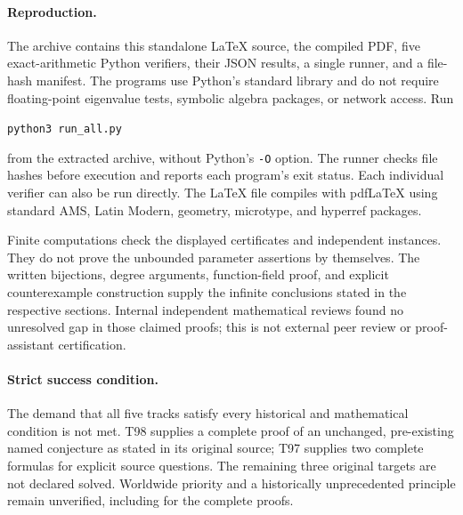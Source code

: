 \documentclass[11pt,a4paper]{article}
\theoremstyle{definition}
\theoremstyle{remark}
\begin{document}
\paragraph{Reproduction.}
The archive contains this standalone \LaTeX{} source, the compiled PDF,
five exact-arithmetic Python verifiers, their JSON results, a single
runner, and a file-hash manifest. The programs use Python's standard
library and do not require floating-point eigenvalue tests, symbolic
algebra packages, or network access. Run
\begin{center}
\texttt{python3 run\_all.py}
\end{center}
from the extracted archive, without Python's \texttt{-O} option.
The runner checks file hashes before execution and reports each
program's exit status. Each individual verifier can also be run directly.
The \LaTeX{} file compiles with pdf\LaTeX{} using standard AMS,
Latin Modern, geometry, microtype, and hyperref packages.

Finite computations check the displayed certificates and independent
instances. They do not prove the unbounded parameter assertions by
themselves. The written bijections, degree arguments, function-field
proof, and explicit counterexample construction supply the infinite
conclusions stated in the respective sections. Internal independent
mathematical reviews found no unresolved gap in those claimed proofs;
this is not external peer review or proof-assistant certification.

\paragraph{Strict success condition.}
The demand that all five tracks satisfy every historical and mathematical
condition is not met. T98 supplies a complete proof of an unchanged,
pre-existing named conjecture as stated in its original source; T97
supplies two complete formulas for explicit source questions. The
remaining three original targets are not declared solved. Worldwide
priority and a historically unprecedented principle remain unverified,
including for the complete proofs.
\end{document}
